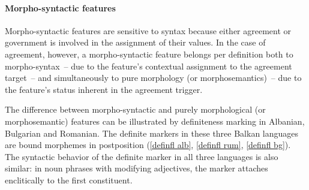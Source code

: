 \paragraph*{Morpho-syntactic features} 
Morpho-syntactic features are sensitive to syntax because either agreement or government is involved in the assignment of their values. In the case of agreement, however, a morpho-syntactic feature belongs per definition both to morpho-syntax~– due to the feature's contextual assignment to the agreement target~– and simultaneously to pure morphology (or morphosemantics)~– due to the feature's status inherent in the agreement trigger.

The difference between morpho-syntactic and purely morphological (or morphosemantic) features can be illustrated by definiteness marking in Albanian, Bulgarian and Romanian. The definite markers in these three Balkan languages are bound morphemes in postposition (\ref{definfl alb}, \ref{definfl rum}, \ref{definfl bg}). The syntactic behavior of the definite marker in all three languages is also similar: in noun phrases with modifying adjectives, the marker attaches enclitically to the first constituent. 
